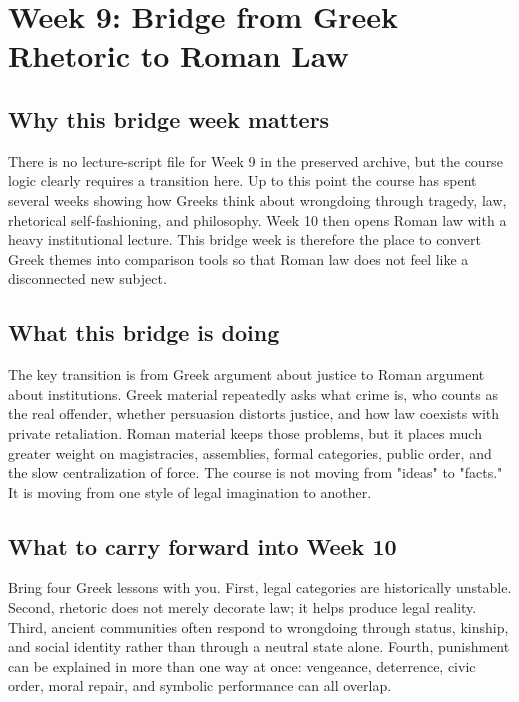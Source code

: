 \documentclass[11pt]{article}
\begin{document}
\section{Week 9: Bridge from Greek Rhetoric to Roman Law}

\subsection{Why this bridge week matters}

There is no lecture-script file for Week 9 in the preserved archive, but the course logic clearly requires a transition here. Up to this point the course has spent several weeks showing how Greeks think about wrongdoing through tragedy, law, rhetorical self-fashioning, and philosophy. Week 10 then opens Roman law with a heavy institutional lecture. This bridge week is therefore the place to convert Greek themes into comparison tools so that Roman law does not feel like a disconnected new subject.

\subsection{What this bridge is doing}

The key transition is from Greek argument about justice to Roman argument about institutions. Greek material repeatedly asks what crime is, who counts as the real offender, whether persuasion distorts justice, and how law coexists with private retaliation. Roman material keeps those problems, but it places much greater weight on magistracies, assemblies, formal categories, public order, and the slow centralization of force. The course is not moving from "ideas" to "facts." It is moving from one style of legal imagination to another.

\subsection{What to carry forward into Week 10}

Bring four Greek lessons with you. First, legal categories are historically unstable. Second, rhetoric does not merely decorate law; it helps produce legal reality. Third, ancient communities often respond to wrongdoing through status, kinship, and social identity rather than through a neutral state alone. Fourth, punishment can be explained in more than one way at once: vengeance, deterrence, civic order, moral repair, and symbolic performance can all overlap.
\end{document}
